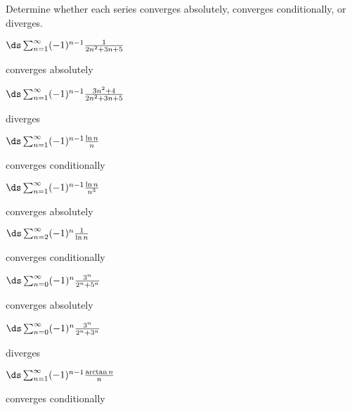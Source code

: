 \begin{enumialphparenastyle}

Determine whether each series converges absolutely, converges
conditionally, or diverges.

\begin{multicols}{2}

\begin{ex}
$\ds\sum_{n=1}^\infty (-1)^{n-1}{1\over 2n^2+3n+5}$
\begin{sol}
converges absolutely
\end{sol}
\end{ex}

\begin{ex}
$\ds\sum_{n=1}^\infty (-1)^{n-1}{3n^2+4\over 2n^2+3n+5}$
\begin{sol}
diverges
\end{sol}
\end{ex}

\begin{ex}
$\ds\sum_{n=1}^\infty (-1)^{n-1}{\ln n\over n}$
\begin{sol}
converges conditionally
\end{sol}
\end{ex}

\begin{ex}
$\ds\sum_{n=1}^\infty (-1)^{n-1} {\ln n\over n^3}$
\begin{sol}
converges absolutely
\end{sol}
\end{ex}

\begin{ex}
$\ds\sum_{n=2}^\infty (-1)^n{1\over \ln n}$
\begin{sol}
converges conditionally
\end{sol}
\end{ex}

\begin{ex}
$\ds\sum_{n=0}^\infty (-1)^{n} {3^n\over 2^n+5^n}$
\begin{sol}
converges absolutely
\end{sol}
\end{ex}

\begin{ex}
$\ds\sum_{n=0}^\infty (-1)^{n} {3^n\over 2^n+3^n}$
\begin{sol}
diverges
\end{sol}
\end{ex}

\begin{ex}
$\ds\sum_{n=1}^\infty (-1)^{n-1} {\arctan n\over n}$
\begin{sol}
converges conditionally
\end{sol}
\end{ex}

\end{multicols}

\end{enumialphparenastyle}